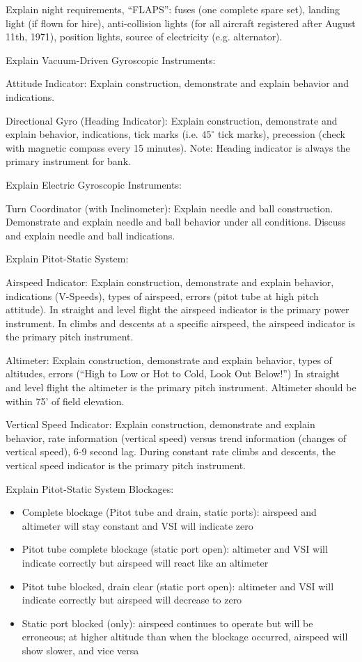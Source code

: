 Explain night requirements, ``FLAPS'': fuses (one complete spare set), landing
light (if flown for hire), anti-collision lights (for all aircraft registered
after August 11th, 1971), position lights, source of electricity (e.g.
alternator).

Explain Vacuum-Driven Gyroscopic Instruments:

Attitude Indicator: Explain construction, demonstrate and explain behavior and
indications.

Directional Gyro (Heading Indicator): Explain construction, demonstrate and
explain behavior, indications, tick marks (i.e. $45^{\circ}$ tick marks),
precession (check with magnetic compass every 15 minutes). Note: Heading
indicator is always the primary instrument for bank.

Explain Electric Gyroscopic Instruments:

Turn Coordinator (with Inclinometer): Explain needle and ball construction.
Demonstrate and explain needle and ball behavior under all conditions. Discuss
and explain needle and ball indications.

Explain Pitot-Static System:

Airspeed Indicator: Explain construction, demonstrate and explain behavior,
indications (V-Speeds), types of airspeed, errors (pitot tube at high pitch
attitude). In straight and level flight the airspeed indicator is the primary
power instrument. In climbs and descents at a specific airspeed, the airspeed
indicator is the primary pitch instrument.

Altimeter: Explain construction, demonstrate and explain behavior, types of
altitudes, errors (``High to Low or Hot to Cold, Look Out Below!'') In straight
and level flight the altimeter is the primary pitch instrument. Altimeter
should be within 75' of field elevation.

Vertical Speed Indicator: Explain construction, demonstrate and explain
behavior, rate information (vertical speed) versus trend information (changes
of vertical speed), 6-9 second lag. During constant rate climbs and descents,
the vertical speed indicator is the primary pitch instrument.

Explain Pitot-Static System Blockages:
\begin{itemize}
  \item Complete blockage (Pitot tube and drain, static ports): airspeed and
    altimeter will stay constant and VSI will indicate zero

  \item Pitot tube complete blockage (static port open): altimeter and VSI will
    indicate correctly but airspeed will react like an altimeter

  \item Pitot tube blocked, drain clear (static port open): altimeter and VSI
    will indicate correctly but airspeed will decrease to zero

  \item Static port blocked (only): airspeed continues to operate but will be
    erroneous; at higher altitude than when the blockage occurred, airspeed
    will show slower, and vice versa
\end{itemize}

